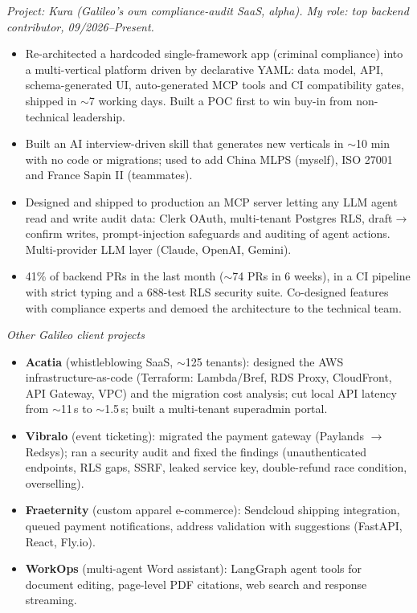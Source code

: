 \documentclass{article}
\begin{document}
\noindent\textit{Project: Kura (Galileo's own compliance-audit SaaS, alpha). My role: top backend contributor, 09/2026--Present.}
\begin{itemize}
    \item Re-architected a hardcoded single-framework app (criminal compliance) into a multi-vertical platform driven by declarative YAML: data model, API, schema-generated UI, auto-generated MCP tools and CI compatibility gates, shipped in $\sim$7 working days. Built a POC first to win buy-in from non-technical leadership.
    \item Built an AI interview-driven skill that generates new verticals in $\sim$10 min with no code or migrations; used to add China MLPS (myself), ISO 27001 and France Sapin II (teammates).
    \item Designed and shipped to production an MCP server letting any LLM agent read and write audit data: Clerk OAuth, multi-tenant Postgres RLS, draft$\rightarrow$confirm writes, prompt-injection safeguards and auditing of agent actions. Multi-provider LLM layer (Claude, OpenAI, Gemini).
    \item 41\% of backend PRs in the last month ($\sim$74 PRs in 6 weeks), in a CI pipeline with strict typing and a 688-test RLS security suite. Co-designed features with compliance experts and demoed the architecture to the technical team.
\end{itemize}

\noindent\textit{Other Galileo client projects}
\begin{itemize}
    \item \textbf{Acatia} (whistleblowing SaaS, $\sim$125 tenants): designed the AWS infrastructure-as-code (Terraform: Lambda/Bref, RDS Proxy, CloudFront, API Gateway, VPC) and the migration cost analysis; cut local API latency from $\sim$11\,s to $\sim$1.5\,s; built a multi-tenant superadmin portal.
    \item \textbf{Vibralo} (event ticketing): migrated the payment gateway (Paylands $\rightarrow$ Redsys); ran a security audit and fixed the findings (unauthenticated endpoints, RLS gaps, SSRF, leaked service key, double-refund race condition, overselling).
    \item \textbf{Fraeternity} (custom apparel e-commerce): Sendcloud shipping integration, queued payment notifications, address validation with suggestions (FastAPI, React, Fly.io).
    \item \textbf{WorkOps} (multi-agent Word assistant): LangGraph agent tools for document editing, page-level PDF citations, web search and response streaming.
\end{itemize}
\end{document}

